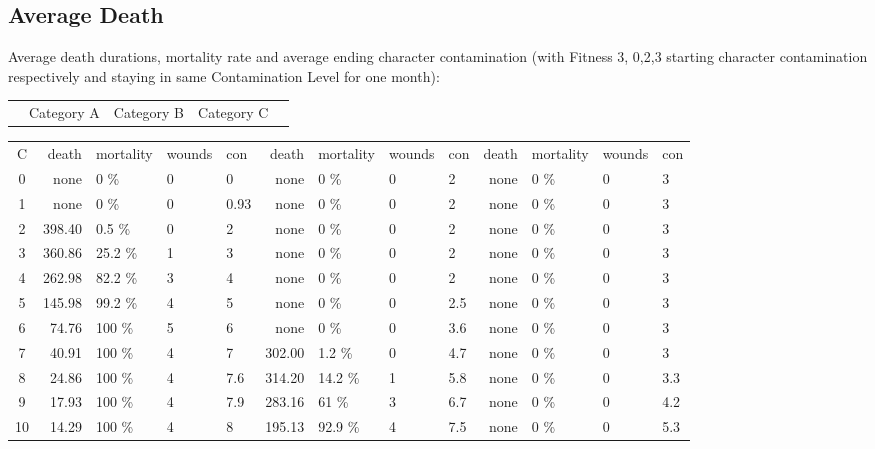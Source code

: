 \subsection{Average Death}
Average death durations, mortality rate and average ending character contamination
(with Fitness 3, 0,2,3 starting character contamination respectively and staying in same Contamination
Level for one month):\par\vspace{0.5cm}
\begin{tabular*}{20cm}{c @{\extracolsep{\fill}}cccc}
    &Category A & Category B & Category C&
\end{tabular*}\par
\fontsize{10}{0}
\begin{tabular}{c|rlll|rlll|rlll}
    C & death & mortality & wounds & con & death & mortality & wounds & con &death & mortality & wounds & con\\
    0  &none   	&0    \% &     0 &     0 &none   	&0    \% &     0 &     2 &none   	&0    \% &     0 &     3\\
    1  &none   	&0    \% &     0 &  0.93 &none   	&0    \% &     0 &     2 &none   	&0    \% &     0 &     3\\
    2  &398.40 	&0.5  \% &     0 &     2 &none   	&0    \% &     0 &     2 &none   	&0    \% &     0 &     3\\
    3  &360.86 	&25.2 \% &     1 &     3 &none   	&0    \% &     0 &     2 &none   	&0    \% &     0 &     3\\
    4  &262.98 	&82.2 \% &     3 &     4 &none   	&0    \% &     0 &     2 &none   	&0    \% &     0 &     3\\
    5  &145.98 	&99.2 \% &     4 &     5 &none   	&0    \% &     0 &   2.5 &none   	&0    \% &     0 &     3\\
    6  & 74.76 	&100  \% &     5 &     6 &none   	&0    \% &     0 &   3.6 &none   	&0    \% &     0 &     3\\
    7  & 40.91 	&100  \% &     4 &     7 &302.00 	&1.2  \% &     0 &   4.7 &none   	&0    \% &     0 &     3\\
    8  & 24.86 	&100  \% &     4 &   7.6 &314.20 	&14.2 \% &     1 &   5.8 &none   	&0    \% &     0 &   3.3\\
    9  & 17.93 	&100  \% &     4 &   7.9 &283.16 	&61   \% &     3 &   6.7 &none   	&0    \% &     0 &   4.2\\
    10 & 14.29 	&100  \% &     4 &     8 &195.13 	&92.9 \% &     4 &   7.5 &none   	&0    \% &     0 &   5.3\\

\end{tabular}
